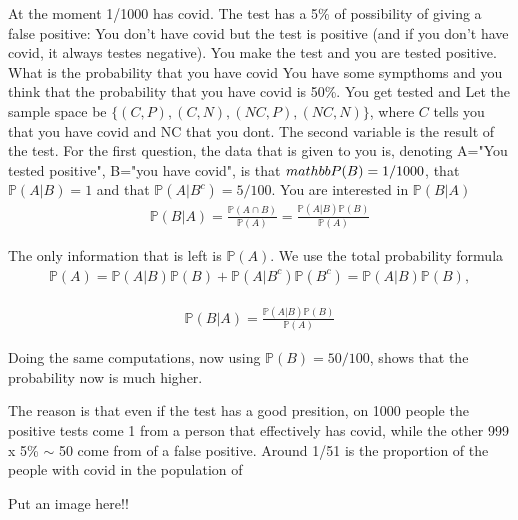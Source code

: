 \documentclass[12pt]{article}
\newcommand{\<}{{\langle \!\! \langle}}
\renewcommand{\>}{{\rangle \!\! \rangle}}
\newcommand{\bel}[2]{\begin{equation} \label{#1} \begin{split} #2
 					\end{split} \end{equation}}
\newcommand{\commento}[1]{
	\par\noindent
	\colorbox{light}{\begin{minipage}{120 mm}#1\end{minipage}}
	\par\noindent
}
\begin{document}
\begin{ExerciseList}

	\Exercise 

	\Exercise At the moment 1/1000 has covid. The test has a 5\% of possibility of giving a false positive: You don't have covid but the test is positive (and if you don't have covid, it always testes negative). 
	\Question You make the test and you are tested positive. What is the probability that you have covid
	\Question You have some sympthoms and you think that the probability that you have covid is 50\%. You get tested and 
	\Answer 
	Let the sample space be $\{(C,P), (C,N), (NC,P), (NC,N)\}$, where $C$ tells you that you have covid and NC that you dont.  The second variable is the result of the test. 
	\Question For the first question, the data that is given to you is, denoting A="You tested positive", B="you have covid", is that $\\mathbb{P}(B)=1/1000$, that $\mathbb{P}(A|B)= 1$ and that $\mathbb{P}(A|B^c)=5/100$. You are interested in 
	$\mathbb{P}(B|A)$ 
	\bel{}{\mathbb{P}(B|A) = \frac{\mathbb{P}(A \cap B)}{\mathbb{P}(A)} = \frac{\mathbb{P}(A|B) \mathbb{P}(B)}{\mathbb{P}(A)}  }
	
	The only information that is left is $\mathbb{P}(A)$. We use the total probability formula 
	\bel{}{\mathbb{P}(A)=\mathbb{P}(A|B) \mathbb{P}(B)+ \mathbb{P}(A|B^c)\mathbb{P}(B^c) = \mathbb{P}(A|B)\mathbb{P}(B),}

	\bel{}{\mathbb{P}(B|A) = \frac{\mathbb{P}(A|B) \mathbb{P}(B)}{\mathbb{P}(A)}  }
	
	\Question Doing the same computations, now using $\mathbb{P}(B) = 50/100$, shows that the probability now is much higher. 

	\commento{The reason is that even if the test has a good presition, on 1000 people the positive tests come 1 from a person that effectively has covid, while the other 999 x 5\% $\sim$ 50 come from  of a false positive. Around 1/51  is the proportion of the people with covid in the population of  }
	Put an image here!!
\end{ExerciseList}
\end{document}
